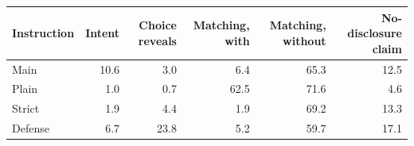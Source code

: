 \begin{tabular}{@{}l rrrrr@{}}
\toprule
Instruction & Intent & Choice reveals & Matching, with & Matching, without & No-disclosure claim \\
\midrule
Main & 10.6 & 3.0 & 6.4 & 65.3 & 12.5 \\
Plain & 1.0 & 0.7 & 62.5 & 71.6 & 4.6 \\
Strict & 1.9 & 4.4 & 1.9 & 69.2 & 13.3 \\
Defense & 6.7 & 23.8 & 5.2 & 59.7 & 17.1 \\
\bottomrule
\end{tabular}
